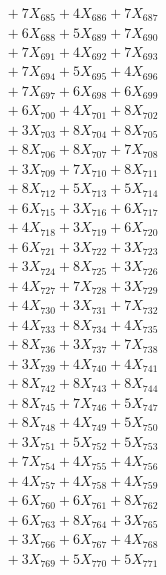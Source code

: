 \documentclass[a4paper,10pt]{article}
\begin{document}
{\begin{align}
&\;  + 7 X_{685} + 4 X_{686} + 7 X_{687} \\[0.3ex]
&\;  + 6 X_{688} + 5 X_{689} + 7 X_{690} \\[0.3ex]
&\;  + 7 X_{691} + 4 X_{692} + 7 X_{693} \\[0.3ex]
&\;  + 7 X_{694} + 5 X_{695} + 4 X_{696} \\[0.3ex]
&\;  + 7 X_{697} + 6 X_{698} + 6 X_{699} \\[0.5ex]\allowbreak
&\;  + 6 X_{700} + 4 X_{701} + 8 X_{702} \\[0.3ex]
&\;  + 3 X_{703} + 8 X_{704} + 8 X_{705} \\[0.3ex]
&\;  + 8 X_{706} + 8 X_{707} + 7 X_{708} \\[0.3ex]
&\;  + 3 X_{709} + 7 X_{710} + 8 X_{711} \\[0.3ex]
&\;  + 8 X_{712} + 5 X_{713} + 5 X_{714} \\[0.3ex]
&\;  + 6 X_{715} + 3 X_{716} + 6 X_{717} \\[0.3ex]
&\;  + 4 X_{718} + 3 X_{719} + 6 X_{720} \\[0.3ex]
&\;  + 6 X_{721} + 3 X_{722} + 3 X_{723} \\[0.3ex]
&\;  + 3 X_{724} + 8 X_{725} + 3 X_{726} \\[0.3ex]
&\;  + 4 X_{727} + 7 X_{728} + 3 X_{729} \\[0.5ex]\allowbreak
&\;  + 4 X_{730} + 3 X_{731} + 7 X_{732} \\[0.3ex]
&\;  + 4 X_{733} + 8 X_{734} + 4 X_{735} \\[0.3ex]
&\;  + 8 X_{736} + 3 X_{737} + 7 X_{738} \\[0.3ex]
&\;  + 3 X_{739} + 4 X_{740} + 4 X_{741} \\[0.3ex]
&\;  + 8 X_{742} + 8 X_{743} + 8 X_{744} \\[0.3ex]
&\;  + 8 X_{745} + 7 X_{746} + 5 X_{747} \\[0.3ex]
&\;  + 8 X_{748} + 4 X_{749} + 5 X_{750} \\[0.3ex]
&\;  + 3 X_{751} + 5 X_{752} + 5 X_{753} \\[0.3ex]
&\;  + 7 X_{754} + 4 X_{755} + 4 X_{756} \\[0.3ex]
&\;  + 4 X_{757} + 4 X_{758} + 4 X_{759} \\[0.5ex]\allowbreak
&\;  + 6 X_{760} + 6 X_{761} + 8 X_{762} \\[0.3ex]
&\;  + 6 X_{763} + 8 X_{764} + 3 X_{765} \\[0.3ex]
&\;  + 3 X_{766} + 6 X_{767} + 4 X_{768} \\[0.3ex]
&\;  + 3 X_{769} + 5 X_{770} + 5 X_{771} \\[0.3ex]

\end{align}}
\end{document}
